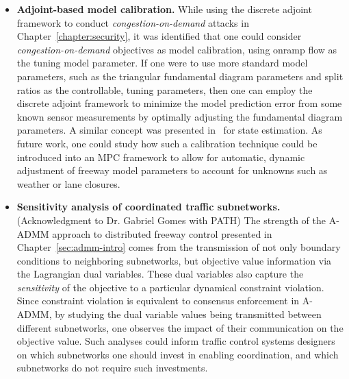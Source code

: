 \begin{itemize}
	\item \textbf{Adjoint-based model calibration.} While using the discrete adjoint framework to conduct \emph{congestion-on-demand} attacks in Chapter~\ref{chapter:security}, it was identified that one could consider \emph{congestion-on-demand} objectives as model calibration, using onramp flow as the tuning model parameter. If one were to use more standard model parameters, such as the triangular fundamental diagram parameters and split ratios as the controllable, tuning parameters, then one can employ the discrete adjoint framework to minimize the model prediction error from some known sensor measurements by optimally adjusting the fundamental diagram parameters. A similar concept was presented in~\cite{Jacquet2005} for state estimation. As future work, one could study how such a calibration technique could be introduced into an MPC framework to allow for automatic, dynamic adjustment of freeway model parameters to account for unknowns such as weather or lane closures.
	\item \textbf{Sensitivity analysis of coordinated traffic subnetworks.} (Acknowledgment to Dr. Gabriel Gomes with PATH) The strength of the A-ADMM approach to distributed freeway control presented in Chapter~\ref{sec:admm-intro} comes from the transmission of not only boundary conditions to neighboring subnetworks, but objective value information via the Lagrangian dual variables. These dual variables also capture the \emph{sensitivity} of the objective to a particular dynamical constraint violation. Since constraint violation is equivalent to consensus enforcement in A-ADMM, by studying the dual variable values being transmitted between different subnetworks, one observes the impact of their communication on the objective value. Such analyses could inform traffic control systems designers on which subnetworks one should invest in enabling coordination, and which subnetworks do not require such investments.
\end{itemize}